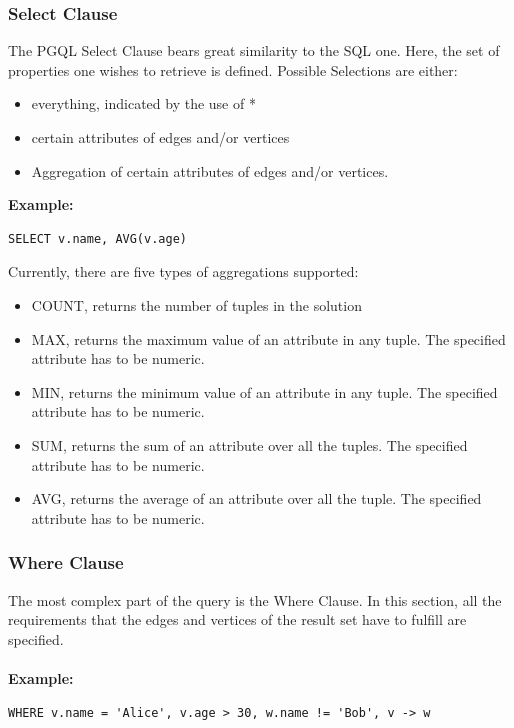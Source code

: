 \documentclass[11pt,singlecolumn]{scrartcl}
\begin{document}
\subsubsection{Select Clause}
The PGQL Select Clause bears great similarity to the SQL one. Here, the set of properties one wishes to retrieve is defined. Possible Selections are either:
\begin{itemize} 
\item everything, indicated by the use of * 
\item certain attributes of edges and/or vertices
\item Aggregation of certain attributes of edges and/or vertices.
\end{itemize}
\textbf{Example:}
\begin{verbatim}
SELECT v.name, AVG(v.age)
 \end{verbatim} 
 Currently, there are five types of aggregations supported:
 \begin{itemize} 
\item COUNT, returns the number of tuples in the solution 
\item MAX, returns the maximum value of an attribute in any tuple. The specified attribute has to be numeric.
\item MIN, returns the minimum value of an attribute in any tuple. The specified attribute has to be numeric.
\item SUM, returns the sum of an attribute over all the tuples. The specified attribute has to be numeric.
\item AVG, returns the average of an attribute over all the tuple. The specified attribute has to be numeric.
\end{itemize}

\subsubsection{Where Clause}
The most complex part of the query is the Where Clause. In this section, all the requirements that the edges and vertices of the result set have to fulfill are specified.\\\\
\textbf{Example:}
\begin{verbatim}
WHERE v.name = 'Alice', v.age > 30, w.name != 'Bob', v -> w
\end{verbatim}
\end{document}
